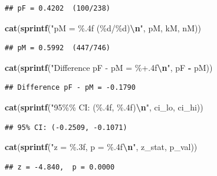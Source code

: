 \documentclass[
]{article}
\newenvironment{Shaded}{\begin{snugshade}}{\end{snugshade}}
\newcommand{\FunctionTok}[1]{\textcolor[rgb]{0.13,0.29,0.53}{\textbf{#1}}}
\newcommand{\NormalTok}[1]{#1}
\newcommand{\SpecialCharTok}[1]{\textcolor[rgb]{0.81,0.36,0.00}{\textbf{#1}}}
\newcommand{\StringTok}[1]{\textcolor[rgb]{0.31,0.60,0.02}{#1}}
\begin{document}
\begin{verbatim}
## pF = 0.4202  (100/238)
\end{verbatim}

\begin{Shaded}
\begin{Highlighting}[]
\FunctionTok{cat}\NormalTok{(}\FunctionTok{sprintf}\NormalTok{(}\StringTok{"pM = \%.4f  (\%d/\%d)}\SpecialCharTok{\textbackslash{}n}\StringTok{"}\NormalTok{, pM, kM, nM))}
\end{Highlighting}
\end{Shaded}

\begin{verbatim}
## pM = 0.5992  (447/746)
\end{verbatim}

\begin{Shaded}
\begin{Highlighting}[]
\FunctionTok{cat}\NormalTok{(}\FunctionTok{sprintf}\NormalTok{(}\StringTok{"Difference pF {-} pM = \%+.4f}\SpecialCharTok{\textbackslash{}n}\StringTok{"}\NormalTok{, pF }\SpecialCharTok{{-}}\NormalTok{ pM))}
\end{Highlighting}
\end{Shaded}

\begin{verbatim}
## Difference pF - pM = -0.1790
\end{verbatim}

\begin{Shaded}
\begin{Highlighting}[]
\FunctionTok{cat}\NormalTok{(}\FunctionTok{sprintf}\NormalTok{(}\StringTok{"95\%\% CI: (\%.4f, \%.4f)}\SpecialCharTok{\textbackslash{}n}\StringTok{"}\NormalTok{, ci\_lo, ci\_hi))}
\end{Highlighting}
\end{Shaded}

\begin{verbatim}
## 95% CI: (-0.2509, -0.1071)
\end{verbatim}

\begin{Shaded}
\begin{Highlighting}[]
\FunctionTok{cat}\NormalTok{(}\FunctionTok{sprintf}\NormalTok{(}\StringTok{"z = \%.3f,  p = \%.4f}\SpecialCharTok{\textbackslash{}n}\StringTok{"}\NormalTok{, z\_stat, p\_val))}
\end{Highlighting}
\end{Shaded}

\begin{verbatim}
## z = -4.840,  p = 0.0000
\end{verbatim}
\end{document}
